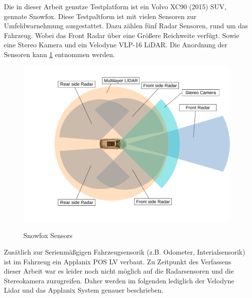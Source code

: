 Die in dieser Arbeit genutze Testplatform ist ein Volvo XC90 (2015) SUV, gennate Snowfox. Diese Testpaltform ist mit vielen Sensoren zur Umfeldwarnehmung ausgestattet.
Dazu zählen fünf Radar Sensoren, rund um das Fahrzeug. Wobei das Front Radar über eine Größere Reichweite verfügt. Sowie eine
Stereo Kamera und ein Velodyne VLP-16 LiDAR. Die Anordnung der Sensoren kann \cref{platform} entnommen werden.


\begin{figure}[!ht]
\caption{Snowfox Sensors}
\includegraphics[width=\columnwidth]{sensors.pdf}
\label{platform}
\end{figure}


Zusätlich zur Serienmäßgigen Fahrzeugsensorik (z.B. Odometer, Interialsensorik) ist im Fahrzeug ein Applanix POS LV verbaut. Zu Zeitpunkt des Verfassens dieser Arbeit war es leider noch nicht möglich auf
die Radarsensoren und die Stereokamera zuzugreifen. Daher werden im folgenden lediglich der Velodyne Lidar und das Applanix System genauer beschrieben.

